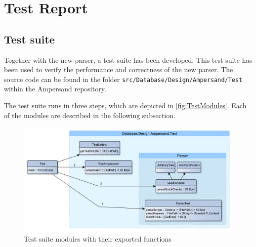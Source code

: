
\section{Test Report}
\label{sec:tests}

\subsection{Test suite}
  Together with the new parser, a test suite has been developed.
  This test suite has been used to verify the performance and correctness of the new parser.
  The source code can be found in the folder \texttt{src/Database/Design/Ampersand/Test} within the Ampersand repository.

  The test suite runs in three steps, which are depicted in \autoref{fig:TestModules}.
  Each of the modules are described in the following subsection.
  \begin{figure}[ht]%
    \includegraphics[width=\columnwidth]{Figures/TestModules}
    \caption{Test suite modules with their exported functions}
    \label{fig:TestModules}
  \end{figure}%


